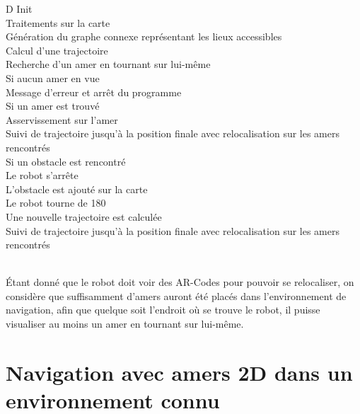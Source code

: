\documentclass[10pt,a4paper]{article}
\begin{document}
\begin{tabbing}
\>D\>
Init\\\>\>\>
	Traitements sur la carte\\\>\>\>
	Génération du graphe connexe représentant les lieux accessibles\\\>\>\>
	Calcul d'une trajectoire\\\>\>
Recherche d'un amer en tournant sur lui-même\\\>\>
Si aucun amer en vue\\\>\>\>
	Message d'erreur et arrêt du programme\\\>\>
Si un amer est trouvé\\\>\>\>
	Asservissement sur l'amer\\\>\>\>
	Suivi de trajectoire jusqu'à la position finale avec relocalisation sur les amers rencontrés\\\>\>
Si un obstacle est rencontré\\\>\>\>
	Le robot s'arrête\\\>\>\>
	L'obstacle est ajouté sur la carte\\\>\>\>
	Le robot tourne de 180\degree\\\>\>\>
	Une nouvelle trajectoire est calculée\\\>\>
Suivi de trajectoire jusqu'à la position finale avec relocalisation sur les amers rencontrés\\\\
	
\end{tabbing}


Étant donné que le robot doit voir des AR-Codes pour pouvoir se relocaliser, on considère que suffisamment d'amers auront été placés dans l'environnement de navigation, afin que quelque soit l'endroit où se trouve le robot, il puisse visualiser au moins un amer en tournant sur lui-même.


\section{Navigation avec amers 2D dans un environnement connu}
\label{sec:navigation_avec_amers_2D_dans_un_environnement_connu}
\end{document}
